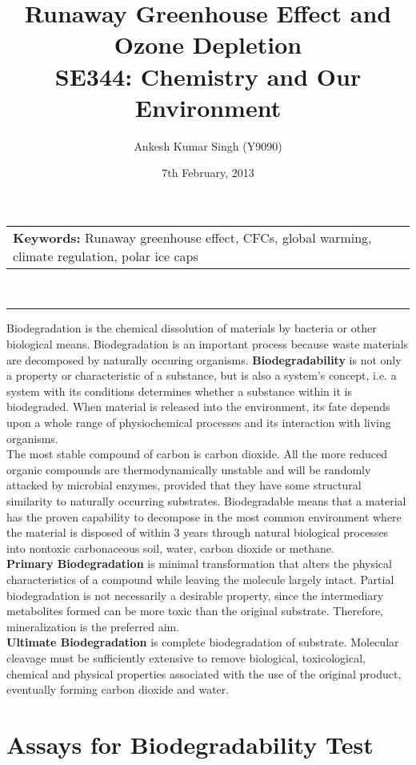 \documentclass[pdftex,11pt,a4paper]{article}
\title{\vspace{-15pt}Runaway Greenhouse Effect and Ozone Depletion\\ SE344: Chemistry and Our Environment}
\author{Ankesh Kumar Singh (Y9090)}
\date{7th February, 2013}
\begin{document}
\maketitle
\begin{tabular}{p{370pt}}
\textbf{Keywords: }Runaway greenhouse effect, CFCs, global warming, climate regulation, polar ice caps
\end{tabular}
\vspace{10pt}\\
\hrule
\vspace{10pt}
Biodegradation is the chemical dissolution of materials by bacteria or other biological means. Biodegradation is an important process because waste materials are decomposed by naturally occuring organisms. \textbf{Biodegradability} is not only a property or characteristic of a substance, but is also a system’s concept, i.e. a system with its conditions determines whether a substance within it is biodegraded. When material is released into the environment, its fate depends upon a whole range of physiochemical processes and its interaction with living organisms. \\

The most stable compound of carbon is carbon dioxide. All the more reduced organic compounds are thermodynamically unstable and will be randomly attacked by microbial enzymes, provided that they have some structural similarity to naturally occurring substrates. Biodegradable means that a material has the proven capability to decompose in the most common environment where the material is disposed of within 3 years through natural biological processes into nontoxic carbonaceous soil, water, carbon dioxide or methane.\\

\textbf{Primary Biodegradation} is minimal transformation that alters the physical characteristics of a compound while leaving the molecule largely intact. Partial biodegradation is not necessarily a desirable property, since the intermediary metabolites formed can be more toxic than the original substrate. Therefore, mineralization is the preferred aim.\\

\textbf{Ultimate Biodegradation} is complete biodegradation of substrate. Molecular cleavage must be sufficiently extensive to remove biological, toxicological, chemical and physical properties associated with the use of the original product, eventually forming carbon dioxide and water.

\section*{Assays for Biodegradability Test}
\end{document}
